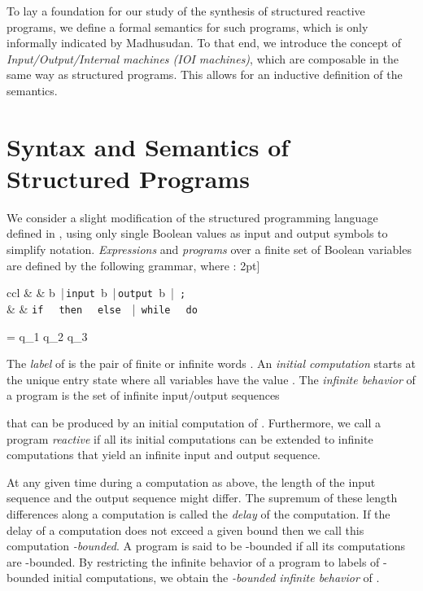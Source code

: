 \documentclass[submission,copyright,creativecommons]{eptcs}
\newcommand{\ignore}[1]{}
\newcommand{\pcode}[1]{\textup{\tt{#1}}}\newcommand{\tup}[1]{\overline{#1}}
\begin{document}
To lay a foundation for our study of the synthesis of structured reactive
programs, we define a formal semantics for such programs, which is only
informally indicated by Madhusudan.
To that end, we introduce the concept of
\emph{Input/Output/Internal machines (IOI machines)},
which are composable in the same way as structured programs.
This allows for an inductive definition of the semantics.
\ignore{TODO: Point to technical report?}

\vspace{5mm}
\section{Syntax and Semantics of Structured Programs}

We consider a slight modification of the structured
programming language defined in \cite{madhusudan:LIPIcs:2011:3247},
using only single Boolean values as input and output symbols to simplify
notation.
\emph{Expressions} and \emph{programs} over a finite set  of
Boolean variables
are defined by the following grammar, where :
\vspace{6pt}
\newcommand{\tbar}{\enspace\,|\,\enspace}\newcommand{\ph}[1]{\langle\mathit{#1}\rangle}
2pt]
	\begin{array}{ccl}
		\ph{prog} & \Coloneqq & b \coloneqq \ph{expr} \tbar \pcode{input }b \tbar \pcode{output }b \tbar
								\ph{prog}\pcode{;}\ph{prog} \\
				&			&	\pcode{if } \ph{expr} \pcode{ then } \ph{prog} \pcode{ else } \ph{prog} \tbar
								\pcode{while } \ph{expr} \pcode{ do } \ph{prog}
	\end{array}

	\varrho = q_1  q_2  q_3  \cdots

The \emph{label} of  is the pair of finite or
infinite words
.
An \emph{initial computation} starts at the unique entry
state where all variables have the value .
The \emph{infinite behavior}  of a program 
is the set of infinite input/output sequences

that can be produced by an initial computation of .
Furthermore, we call a program \emph{reactive} if all its initial computations
can be extended to infinite computations that yield an infinite input
and output sequence.

At any given time during a computation  as above, the length of the
input sequence  and the output sequence 
might differ.
The supremum of these length differences along a computation is called the
\emph{delay} of the computation.
If the delay of a computation does not exceed a given bound
 then we call this computation \emph{-bounded}.
A program is said to be -bounded if all its computations are -bounded.
By restricting the infinite behavior of a program  to labels of
-bounded initial computations,
we obtain the \emph{-bounded infinite behavior}  of .
\end{document}
